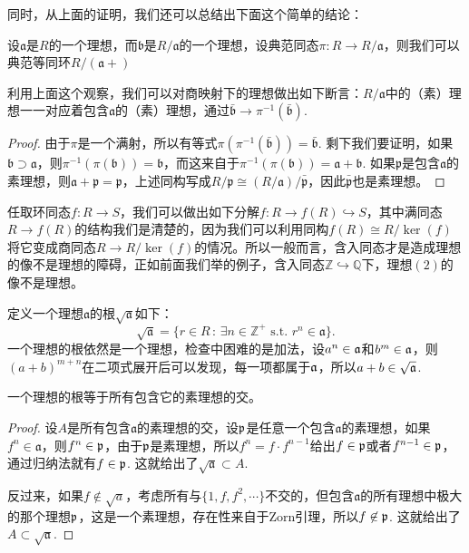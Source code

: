 同时，从上面的证明，我们还可以总结出下面这个简单的结论：
\begin{lem}
设$\mathfrak a$是$R$的一个理想，而$\mathfrak{b}$是$R/\mathfrak a$的一个理想，设典范同态$\pi:R\to R/\mathfrak a$，则我们可以典范等同环$R/(\mathfrak a+)$
\end{lem}

利用上面这个观察，我们可以对商映射下的理想做出如下断言：$R/\mathfrak{a}$中的（素）理想一一对应着包含$\mathfrak{a}$的（素）理想，通过$\bar{\mathfrak{b}}\to \pi^{-1}(\bar{\mathfrak{b}})$.

\begin{proof} 
	由于$\pi$是一个满射，所以有等式$\pi(\pi^{-1}(\bar{\mathfrak{b}}))=\bar{\mathfrak{b}}$. 剩下我们要证明，如果$\mathfrak{b}\supset \mathfrak{a}$，则$\pi^{-1}(\pi(\mathfrak{b}))=\mathfrak{b}$，而这来自于$\pi^{-1}(\pi(\mathfrak{b}))=\mathfrak{a}+\mathfrak{b}$. 如果$\mathfrak{p}$是包含$\mathfrak{a}$的素理想，则$\mathfrak{a}+\mathfrak{p}=\mathfrak{p}$，上述同构写成$R/\mathfrak{p}\cong (R/\mathfrak{a})/\bar{\mathfrak{p}}$，因此$\bar{\mathfrak{p}}$也是素理想。
\end{proof}

任取环同态$f:R\to S$，我们可以做出如下分解$f:R\to f(R)\hookrightarrow S$，其中满同态$R\to f(R)$的结构我们是清楚的，因为我们可以利用同构$f(R)\cong R/\ker(f)$将它变成商同态$R\to R/\ker(f)$的情况。所以一般而言，含入同态才是造成理想的像不是理想的障碍，正如前面我们举的例子，含入同态$\mathbb{Z}\hookrightarrow \mathbb{Q}$下，理想$(2)$的像不是理想。

\begin{para}
定义一个理想$\mathfrak{a}$的根$\sqrt{\mathfrak{a}}$如下：
\[
	\sqrt{\mathfrak{a}}=\{r\in R\,:\,\exists n\in \mathbb{Z}^+\text{ s.t. }r^n\in \mathfrak{a}\}.
\]
一个理想的根依然是一个理想，检查中困难的是加法，设$a^n\in \mathfrak{a}$和$b^m\in \mathfrak{a}$，则$(a+b)^{m+n}$在二项式展开后可以发现，每一项都属于$\mathfrak{a}$，所以$a+b\in \sqrt{\mathfrak{a}}$.
\end{para}

\begin{pro}
一个理想的根等于所有包含它的素理想的交。
\end{pro}

\begin{proof}
设$A$是所有包含$\mathfrak{a}$的素理想的交，设$\mathfrak{p}$是任意一个包含$\mathfrak{a}$的素理想，如果$f^n\in \mathfrak{a}$，则$f^n\in \mathfrak{p}$，由于$\mathfrak{p}$是素理想，所以$f^n=f\cdot f^{n-1}$给出$f\in\mathfrak{p}$或者$f^{n-1}\in\mathfrak{p}$，通过归纳法就有$f\in \mathfrak{p}$. 这就给出了$\sqrt{\mathfrak{a}}\subset A$. 

反过来，如果$f\not\in \sqrt{a}$，考虑所有与$\{1,f,f^2,\cdots\}$不交的，但包含$\mathfrak{a}$的所有理想中极大的那个理想$\mathfrak{p}$，这是一个素理想，存在性来自于Zorn引理，所以$f\not\in \mathfrak{p}$. 这就给出了$A\subset \sqrt{\mathfrak{a}}$.
\end{proof}

